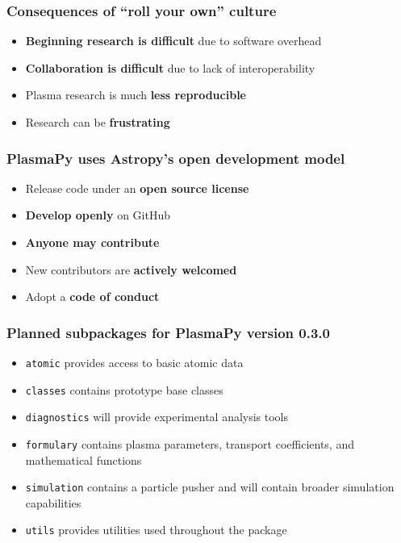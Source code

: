 \documentclass[default,compress]{beamer}
\begin{document}
\begin{frame}[plain]
    \frametitle{Consequences of ``roll your own'' culture}
    \begin{itemize}
    \item \textbf{Beginning research is difficult} due to software overhead
    \item \textbf{Collaboration is difficult} due to lack of interoperability
    \item Plasma research is much \textbf{less reproducible}
    \item Research can be \textbf{frustrating}
    \end{itemize}
        \vspace{3mm}
    \begin{center}
    \end{center}
\end{frame}


\begin{frame}[plain]
    \frametitle{PlasmaPy uses Astropy's open development model}
    \begin{itemize}
    \item Release code under an \textbf{open source license}
    \item \textbf{Develop openly} on GitHub
    \item \textbf{Anyone may contribute} 
    \item New contributors are \textbf{actively welcomed}
    \item Adopt a \textbf{code of conduct}
    \end{itemize}
\end{frame}


\begin{frame}[plain]
    \frametitle{Planned subpackages for PlasmaPy version 0.3.0}  
    \begin{itemize}
    \item \texttt{atomic} provides access to basic atomic data
    \item \texttt{classes} contains prototype base classes
    \item \texttt{diagnostics} will provide experimental analysis tools
    \item \texttt{formulary} contains plasma parameters, transport coefficients, and mathematical functions
    \item \texttt{simulation} contains a particle pusher and will contain broader simulation capabilities
    \item \texttt{utils} provides utilities used throughout the package
    \end{itemize}
\end{frame}
\end{document}
